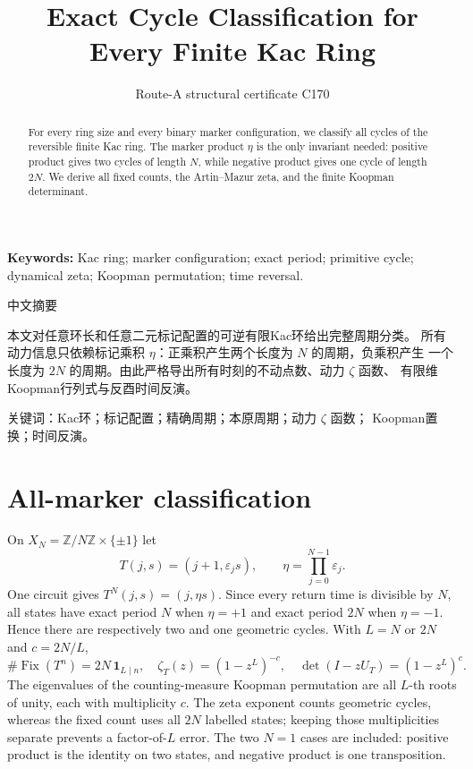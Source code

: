 \documentclass[10pt]{article}
\title{Exact Cycle Classification for Every Finite Kac Ring}
\author{Route-A structural certificate C170}
\date{}
\begin{document}
\maketitle
\begin{abstract}
For every ring size and every binary marker configuration, we classify all
cycles of the reversible finite Kac ring.  The marker product $\eta$ is the
only invariant needed: positive product gives two cycles of length $N$, while
negative product gives one cycle of length $2N$.  We derive all fixed counts,
the Artin--Mazur zeta, and the finite Koopman determinant.
\end{abstract}
\noindent\textbf{Keywords:} Kac ring; marker configuration; exact period;
primitive cycle; dynamical zeta; Koopman permutation; time reversal.

\begin{otherlanguage}{chinese-simplified}
\begin{center}{\large 中文摘要}\end{center}
本文对任意环长和任意二元标记配置的可逆有限\foreignlanguage{english}{Kac}环给出完整周期分类。
所有动力信息只依赖标记乘积 $\eta$：正乘积产生两个长度为 $N$ 的周期，负乘积产生
一个长度为 $2N$ 的周期。由此严格导出所有时刻的不动点数、动力 $\zeta$ 函数、
有限维\foreignlanguage{english}{Koopman}行列式与反酉时间反演。

\noindent 关键词：\foreignlanguage{english}{Kac}环；标记配置；精确周期；本原周期；动力 $\zeta$ 函数；
\foreignlanguage{english}{Koopman}置换；时间反演。
\end{otherlanguage}
\section{All-marker classification}
On $X_N=\mathbb Z/N\mathbb Z\times\{\pm1\}$ let
\[
T(j,s)=(j+1,\varepsilon_j s),\qquad
\eta=\prod_{j=0}^{N-1}\varepsilon_j.
\]
One circuit gives $T^N(j,s)=(j,\eta s)$.  Since every return time is divisible
by $N$, all states have exact period $N$ when $\eta=+1$ and exact period $2N$
when $\eta=-1$.  Hence there are respectively two and one geometric cycles.
With $L=N$ or $2N$ and $c=2N/L$,
\[
\#\operatorname{Fix}(T^n)=2N\,\mathbf1_{L\mid n},\quad
\zeta_T(z)=(1-z^L)^{-c},\quad
\det(I-zU_T)=(1-z^L)^c.
\]
The eigenvalues of the counting-measure Koopman permutation are all $L$-th
roots of unity, each with multiplicity $c$.
The zeta exponent counts geometric cycles, whereas the fixed count uses all
$2N$ labelled states; keeping those multiplicities separate prevents a
factor-of-$L$ error.  The two $N=1$ cases are included: positive product is
the identity on two states, and negative product is one transposition.
\end{document}
